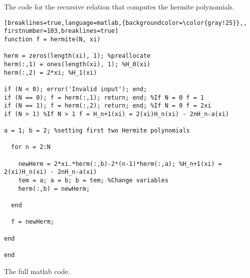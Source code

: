 \documentclass{article}
\begin{document}
The code for the recursive relation that computes the hermite polynomials.

\begin{lstlisting}[breaklines=true,language=matlab,{backgroundcolor=\color{gray!25}},, firstnumber=103,breaklines=true]
function f = hermite(N, xi)

herm = zeros(length(xi), 1); %preallocate 
herm(:,1) = ones(length(xi), 1); %H_0(xi)
herm(:,2) = 2*xi; %H_1(xi)

if (N < 0); error('Invalid input'); end;
if (N == 0); f = herm(:,1); return; end; %If N = 0 f = 1
if (N == 1); f = herm(:,2); return; end; %If N = 0 f = 2xi
if (N > 1) %If N > 1 f = H_n+1(xi) = 2(xi)H_n(xi) - 2nH_n-a(xi)

a = 1; b = 2; %setting first two Hermite polynomials

  for n = 2:N
      
    newHerm = 2*xi.*herm(:,b)-2*(n-1)*herm(:,a); %H_n+1(xi) = 2(xi)H_n(xi) - 2nH_n-a(xi)
    tem = a; a = b; b = tem; %Change variables
    herm(:,b) = newHerm;
    
  end

  f = newHerm;

end

end
\end{lstlisting}

The full matlab code.


\end{document}

